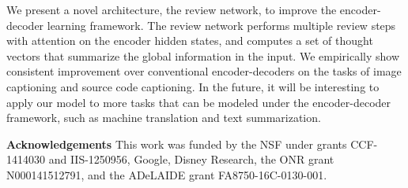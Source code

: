 \documentclass{article}
\begin{document}
We present a novel architecture, the review network, to improve the encoder-decoder learning framework. The review network performs multiple review steps with attention on the encoder hidden states, and computes a set of thought vectors that summarize the global information in the input. We empirically show consistent improvement over conventional encoder-decoders on the tasks of image captioning and source code captioning. In the future, it will be interesting to apply our model to more tasks that can be modeled under the encoder-decoder framework, such as machine translation and text summarization.



\textbf{Acknowledgements} This work was funded by the NSF under grants CCF-1414030 and IIS-1250956, Google, Disney Research, the ONR grant N000141512791, and the ADeLAIDE grant FA8750-16C-0130-001.



\end{document}

